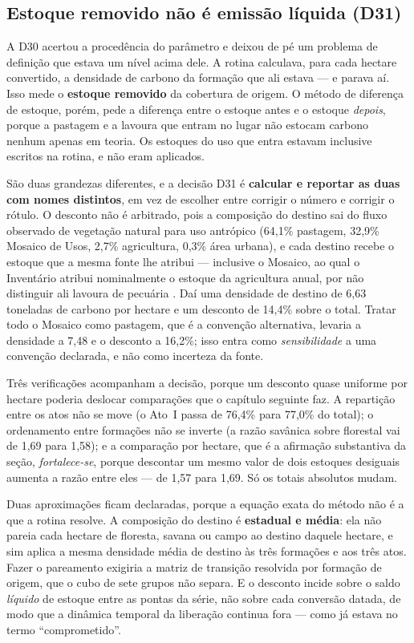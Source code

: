 \subsection{Estoque removido não é emissão líquida (D31)}
\label{sec:met-d31}

A D30 acertou a procedência do parâmetro e deixou de pé um problema de
definição que estava um nível acima dele. A rotina calculava, para cada
hectare convertido, a densidade de carbono da formação que ali estava --- e
parava aí. Isso mede o \textbf{estoque removido} da cobertura de origem. O
método de diferença de estoque, porém, pede a diferença entre o estoque antes
e o estoque \emph{depois}, porque a pastagem e a lavoura que entram no lugar
não estocam carbono nenhum apenas em teoria. Os estoques do uso que entra
estavam inclusive escritos na rotina, e não eram aplicados.

São duas grandezas diferentes, e a decisão D31 é \textbf{calcular e reportar
as duas com nomes distintos}, em vez de escolher entre corrigir o número e
corrigir o rótulo. O desconto não é arbitrado, pois a composição do destino sai do
fluxo observado de vegetação natural para uso antrópico (64,1\% pastagem,
32,9\% Mosaico de Usos, 2,7\% agricultura, 0,3\% área urbana), e cada destino
recebe o estoque que a mesma fonte lhe atribui --- inclusive o Mosaico, ao
qual o Inventário atribui nominalmente o estoque da agricultura anual, por
não distinguir ali lavoura de pecuária \cite{SEEG2025}. Daí uma densidade de
destino de 6,63 toneladas de carbono por hectare e um desconto de 14,4\% sobre
o total. Tratar todo o Mosaico como pastagem, que é a convenção alternativa,
levaria a densidade a 7,48 e o desconto a 16,2\%; isso entra como
\emph{sensibilidade} a uma convenção declarada, e não como incerteza da fonte.

Três verificações acompanham a decisão, porque um desconto quase uniforme por
hectare poderia deslocar comparações que o capítulo seguinte faz. A repartição
entre os atos não se move (o Ato~I passa de 76,4\% para 77,0\% do total); o
ordenamento entre formações não se inverte (a razão savânica sobre florestal
vai de 1,69 para 1,58); e a comparação por hectare, que é a afirmação
substantiva da seção, \emph{fortalece-se}, porque descontar um mesmo valor de
dois estoques desiguais aumenta a razão entre eles --- de 1,57 para 1,69. Só
os totais absolutos mudam.

Duas aproximações ficam declaradas, porque a equação exata do método não é
a que a rotina resolve. A composição do destino é \textbf{estadual e média}: ela
não pareia cada hectare de floresta, savana ou campo ao destino daquele
hectare, e sim aplica a mesma densidade média de destino às três formações e
aos três atos. Fazer o pareamento exigiria a matriz de transição resolvida
por formação de origem, que o cubo de sete grupos não separa. E o desconto
incide sobre o saldo \emph{líquido} de estoque entre as pontas da série, não sobre
cada conversão datada, de modo que a dinâmica temporal da liberação continua
fora --- como já estava no termo ``comprometido''.

